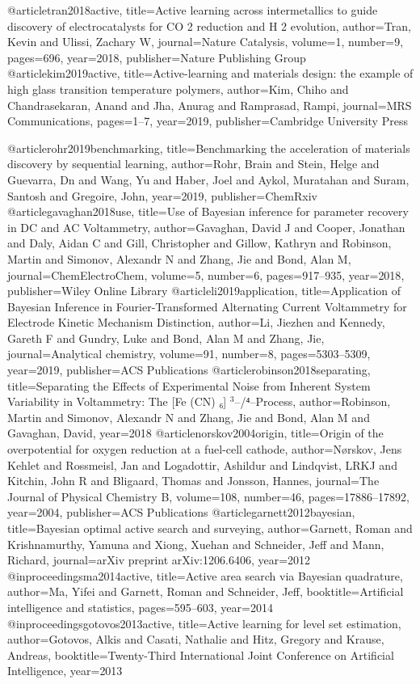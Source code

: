 @article{tran2018active,
  title={Active learning across intermetallics to guide discovery of electrocatalysts for CO 2 reduction and H 2 evolution},
  author={Tran, Kevin and Ulissi, Zachary W},
  journal={Nature Catalysis},
  volume={1},
  number={9},
  pages={696},
  year={2018},
  publisher={Nature Publishing Group}
}
@article{kim2019active,
  title={Active-learning and materials design: the example of high glass transition temperature polymers},
  author={Kim, Chiho and Chandrasekaran, Anand and Jha, Anurag and Ramprasad, Rampi},
  journal={MRS Communications},
  pages={1--7},
  year={2019},
  publisher={Cambridge University Press}
}

@article{rohr2019benchmarking,
  title={Benchmarking the acceleration of materials discovery by sequential learning},
  author={Rohr, Brain and Stein, Helge and Guevarra, Dn and Wang, Yu and Haber, Joel and Aykol, Muratahan and Suram, Santosh and Gregoire, John},
  year={2019},
  publisher={ChemRxiv}
}
@article{gavaghan2018use,
  title={Use of Bayesian inference for parameter recovery in DC and AC Voltammetry},
  author={Gavaghan, David J and Cooper, Jonathan and Daly, Aidan C and Gill, Christopher and Gillow, Kathryn and Robinson, Martin and Simonov, Alexandr N and Zhang, Jie and Bond, Alan M},
  journal={ChemElectroChem},
  volume={5},
  number={6},
  pages={917--935},
  year={2018},
  publisher={Wiley Online Library}
}
@article{li2019application,
  title={Application of Bayesian Inference in Fourier-Transformed Alternating Current Voltammetry for Electrode Kinetic Mechanism Distinction},
  author={Li, Jiezhen and Kennedy, Gareth F and Gundry, Luke and Bond, Alan M and Zhang, Jie},
  journal={Analytical chemistry},
  volume={91},
  number={8},
  pages={5303--5309},
  year={2019},
  publisher={ACS Publications}
}
@article{robinson2018separating,
  title={Separating the Effects of Experimental Noise from Inherent System Variability in Voltammetry: The [Fe (CN) ₆] $^3$--/⁴--Process},
  author={Robinson, Martin and Simonov, Alexandr N and Zhang, Jie and Bond, Alan M and Gavaghan, David},
  year={2018}
}
@article{norskov2004origin,
  title={Origin of the overpotential for oxygen reduction at a fuel-cell cathode},
  author={N{\o}rskov, Jens Kehlet and Rossmeisl, Jan and Logadottir, Ashildur and Lindqvist, LRKJ and Kitchin, John R and Bligaard, Thomas and Jonsson, Hannes},
  journal={The Journal of Physical Chemistry B},
  volume={108},
  number={46},
  pages={17886--17892},
  year={2004},
  publisher={ACS Publications}
}
@article{garnett2012bayesian,
  title={Bayesian optimal active search and surveying},
  author={Garnett, Roman and Krishnamurthy, Yamuna and Xiong, Xuehan and Schneider, Jeff and Mann, Richard},
  journal={arXiv preprint arXiv:1206.6406},
  year={2012}
}
@inproceedings{ma2014active,
  title={Active area search via Bayesian quadrature},
  author={Ma, Yifei and Garnett, Roman and Schneider, Jeff},
  booktitle={Artificial intelligence and statistics},
  pages={595--603},
  year={2014}
}
@inproceedings{gotovos2013active,
  title={Active learning for level set estimation},
  author={Gotovos, Alkis and Casati, Nathalie and Hitz, Gregory and Krause, Andreas},
  booktitle={Twenty-Third International Joint Conference on Artificial Intelligence},
  year={2013}
}

